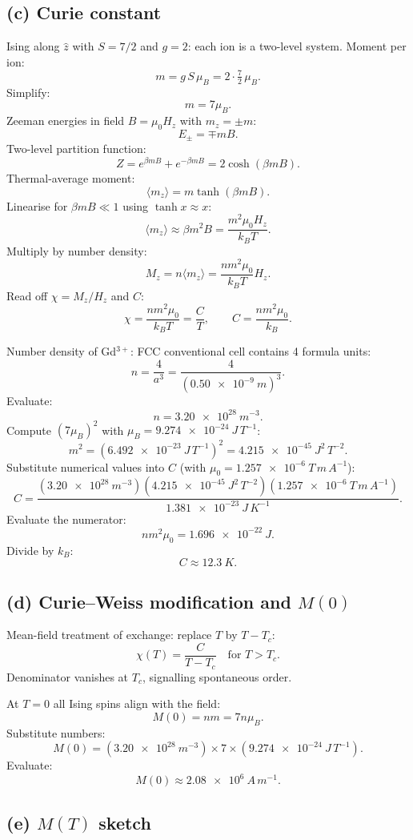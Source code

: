 \documentclass[11pt]{article}
\begin{document}
\subsection*{(c) Curie constant}

Ising along $\hat z$ with $S=7/2$ and $g=2$: each ion is a two-level system. Moment per ion:
\[
m = g\,S\,\mu_B = 2\cdot\tfrac72\,\mu_B.
\]
Simplify:
\[
m = 7\mu_B.
\]
Zeeman energies in field $B=\mu_0 H_z$ with $m_z=\pm m$:
\[
E_\pm = \mp m B.
\]
Two-level partition function:
\[
Z = e^{\beta m B}+e^{-\beta m B} = 2\cosh(\beta m B).
\]
Thermal-average moment:
\[
\langle m_z\rangle = m\tanh(\beta m B).
\]
Linearise for $\beta m B\ll 1$ using $\tanh x\approx x$:
\[
\langle m_z\rangle \approx \beta m^2 B = \frac{m^2 \mu_0 H_z}{k_B T}.
\]
Multiply by number density:
\[
M_z = n\langle m_z\rangle = \frac{n m^2 \mu_0}{k_B T} H_z.
\]
Read off $\chi=M_z/H_z$ and $C$:
\[
\chi = \frac{n m^2 \mu_0}{k_B T} = \frac{C}{T},\qquad C = \frac{n m^2 \mu_0}{k_B}.
\]

Number density of Gd$^{3+}$: FCC conventional cell contains 4 formula units:
\[
n = \frac{4}{a^3} = \frac{4}{(\SI{0.50e-9}{m})^3}.
\]
Evaluate:
\[
n = \SI{3.20e28}{m^{-3}}.
\]
Compute $(7\mu_B)^2$ with $\mu_B = \SI{9.274e-24}{J\,T^{-1}}$:
\[
m^2 = (\SI{6.492e-23}{J\,T^{-1}})^2 = \SI{4.215e-45}{J^2\,T^{-2}}.
\]
Substitute numerical values into $C$ (with $\mu_0 = \SI{1.257e-6}{T\,m\,A^{-1}}$):
\[
C = \frac{(\SI{3.20e28}{m^{-3}})(\SI{4.215e-45}{J^2\,T^{-2}})(\SI{1.257e-6}{T\,m\,A^{-1}})}{\SI{1.381e-23}{J\,K^{-1}}}.
\]
Evaluate the numerator:
\[
n m^2 \mu_0 = \SI{1.696e-22}{J}.
\]
Divide by $k_B$:
\[
\boxed{\;C \approx \SI{12.3}{K}.\;}
\]

\subsection*{(d) Curie--Weiss modification and $M(0)$}

Mean-field treatment of exchange: replace $T$ by $T-T_c$:
\[
\boxed{\;\chi(T) = \frac{C}{T - T_c}\quad\text{for }T > T_c.\;}
\]
Denominator vanishes at $T_c$, signalling spontaneous order.

At $T=0$ all Ising spins align with the field:
\[
M(0) = n m = 7 n \mu_B.
\]
Substitute numbers:
\[
M(0) = (\SI{3.20e28}{m^{-3}})\times 7\times(\SI{9.274e-24}{J\,T^{-1}}).
\]
Evaluate:
\[
\boxed{\;M(0) \approx \SI{2.08e6}{A\,m^{-1}}.\;}
\]

\subsection*{(e) $M(T)$ sketch}
\end{document}
